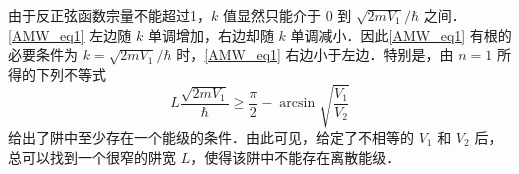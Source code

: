 由于反正弦函数宗量不能超过1，$k$ 值显然只能介于 $0$ 到 $\sqrt{2mV_1}/\hbar$ 之间．\autoref{AMW_eq1} 左边随 $k$ 单调增加，右边却随 $k$ 单调减小．因此\autoref{AMW_eq1} 有根的必要条件为 $k=\sqrt{2mV_1}/\hbar$ 时，\autoref{AMW_eq1} 右边小于左边．特别是，由 $n=1$ 所得的下列不等式
\begin{equation}
L\frac{\sqrt{2mV_1}}{\hbar}\geq\frac{\pi}{2}-\arcsin\sqrt{\frac{V_1}{V_2}}
\end{equation}
给出了阱中至少存在一个能级的条件．由此可见，给定了不相等的 $V_1$ 和 $V_2$ 后，总可以找到一个很窄的阱宽 $L$，使得该阱中不能存在离散能级．